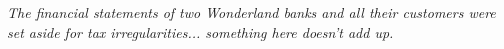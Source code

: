 
{\it The financial statements of two Wonderland banks and all their customers were set aside for tax irregularities... something here doesn't add up.}\\

\noindent\makebox[\linewidth]{\rule{\textwidth}{0.4pt}}
